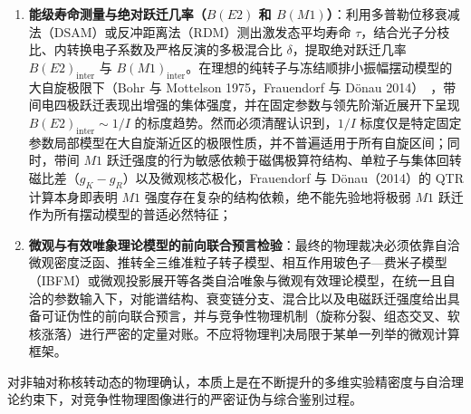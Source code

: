 \begin{enumerate}
\begin{itemize}
\begin{equation}
\end{equation}
采用磁矩型算符 $\mathcal{M}_\mu$ 时，公式中等价提取为 $E_\gamma/\hbar$ 因子；以各自命名单位归一化的无量纲数值 $b_{M1}$ 完全相同，绝不应在量纲换算中再次额外施加 $c^2$ 因子；
\end{itemize}
\item \textbf{能级寿命测量与绝对跃迁几率（$B(E2)$ 和 $B(M1)$）}：利用多普勒位移衰减法（DSAM）或反冲距离法（RDM）测出激发态平均寿命 $\tau$，结合光子分枝比、内转换电子系数及严格反演的多极混合比 $\delta$，提取绝对跃迁几率 $B(E2)_{\text{inter}}$ 与 $B(M1)_{\text{inter}}$。在理想的纯转子与冻结顺排小振幅摆动模型的大自旋极限下（Bohr 与 Mottelson 1975，Frauendorf 与 D{\"o}nau 2014）~\cite{book-bohr-mottelson-nuclear-structure-vol2,frauendorf-2014-transverse-wobbling}，带间电四极跃迁表现出增强的集体强度，并在固定参数与领先阶渐近展开下呈现 $B(E2)_{\text{inter}} \sim 1/I$ 的标度趋势。然而必须清醒认识到，$1/I$ 标度仅是特定固定参数局部模型在大自旋渐近区的极限性质，并不普遍适用于所有自旋区间；同时，带间 $M1$ 跃迁强度的行为敏感依赖于磁偶极算符结构、单粒子与集体回转磁比差（$g_K - g_R$）以及微观核芯极化，Frauendorf 与 D{\"o}nau（2014）的 QTR 计算本身即表明 $M1$ 强度存在复杂的结构依赖，绝不能先验地将极弱 $M1$ 跃迁作为所有摆动模型的普适必然特征；
\item \textbf{微观与有效唯象理论模型的前向联合预言检验}：最终的物理裁决必须依靠自洽微观密度泛函、推转全三维准粒子转子模型、相互作用玻色子—费米子模型（IBFM）或微观投影展开等各类自洽唯象与微观有效理论模型，在统一且自洽的参数输入下，对能谱结构、衰变链分支、混合比以及电磁跃迁强度给出具备可证伪性的前向联合预言，并与竞争性物理机制（旋称分裂、组态交叉、软核涨落）进行严密的定量对账。不应将物理判决局限于某单一列举的微观计算框架。
\end{enumerate}

对非轴对称核转动态的物理确认，本质上是在不断提升的多维实验精密度与自洽理论约束下，对竞争性物理图像进行的严密证伪与综合鉴别过程。
